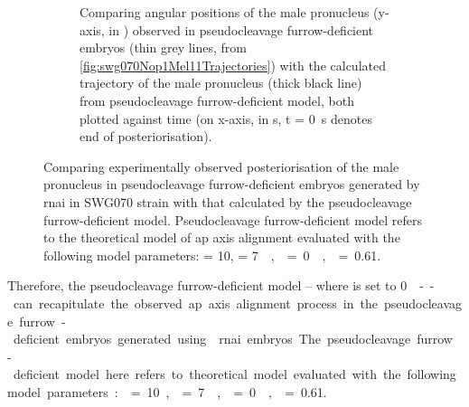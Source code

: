 \begin{figure}
\begin{subfigure}[t]{0.45\textwidth}
        \caption{Comparing angular positions of the male pronucleus (y-axis, in \si{\unitAngle}) observed in pseudocleavage furrow-deficient embryos (thin grey lines, from \autoref{fig:swg070Nop1Mel11Trajectories}) with the calculated trajectory of the male pronucleus (thick black line) from pseudocleavage furrow-deficient model, both plotted against time (on x-axis, in \si{\second}, t = \SI{0}{\second} denotes end of posteriorisation).}
        \label{subfig:pcfRemoveModelCompareExpt-tracks}
    \end{subfigure}
    \caption[Experimentally observed posteriorisation in pseudocleavage furrow-deficient embryos compared with that calculated by theoretical model]{Comparing experimentally observed posteriorisation of the male pronucleus in pseudocleavage furrow-deficient embryos generated by  \ac{rnai} in SWG070 strain with that calculated by the pseudocleavage furrow-deficient model. Pseudocleavage furrow-deficient model refers to the theoretical model of \ac{ap} axis alignment evaluated with the following model parameters: \hydrodynamicLength = \SI{10}{\unitLength}, \activeRelaxLength = \SI{7}{\square\unitLength\per\second}, \nematicLength = \SI{0}{\square\unitLength\per\second}, \dragCoefficient = \num{0.61}.}
    \label{fig:pcfRemoveModelCompareExpt}
\end{figure} 

Therefore, the pseudocleavage furrow-deficient model -- where \nematicLength is set to \SI{0}{\square\unitLength\per\second} -- can recapitulate the observed \ac{ap} axis alignment process in the pseudocleavage furrow-deficient embryos generated using  \ac{rnai} embryos. The pseudocleavage furrow-deficient model here refers to theoretical model evaluated with the following model parameters: \hydrodynamicLength = \SI{10}{\unitLength}, \activeRelaxLength = \SI{7}{\square\unitLength\per\second}, \nematicLength = \SI{0}{\square\unitLength\per\second}, \dragCoefficient = \num{0.61}.

